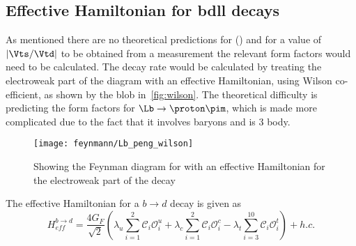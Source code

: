 
\subsection{Effective Hamiltonian for b\to dll decays} %
As mentioned there are no theoretical predictions for \BF(\Lbpi) and for a value of $|\Vts/\Vtd|$ to be obtained from a measurement the relevant form factors would need to be calculated. The decay rate would be calculated by treating the electroweak part of the diagram with an effective Hamiltonian, using Wilson co-efficient, as shown by the blob in~\autoref{fig:wilson}. The theoretical difficulty is predicting the form factors for $\Lb\to\proton\pim$, which is made more complicated due to the fact that it involves baryons and is 3 body.
\begin{figure}[h!]
  \centering
  \texttt{[image: feynmann/Lb\_peng\_wilson]}
  \caption{Showing the Feynman diagram for \Lbpi with an effective Hamiltonian for the electroweak part of the decay~\cite{lowrecoil}}
  \label{fig:wilson}
    \end{figure}
The effective Hamiltonian for a $b\to d$ decay is given as
\begin{equation}
H^{b\to d}_{eff} = \frac{4G_{F}}{\sqrt{2}}(\lambda_{u}\sum^{2}_{i=1}\mathcal{C}_{i}\mathcal{O}^{u}_{i} + \lambda_{c}\sum^{2}_{i=1}\mathcal{C}_{i}\mathcal{O}^{c}_{i} - \lambda_{t}\sum^{10}_{i=3}\mathcal{C}_{i}\mathcal{O}^{t}_{i}) + h.c.
\end{equation}

